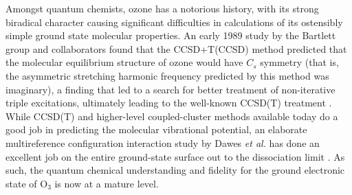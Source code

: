 \documentclass[12pt,a4paper,prb,aps,superscriptaddress]{revtex4}
\begin{document}
Amongst quantum chemists, ozone has a notorious history, with its strong
biradical character causing significant difficulties in calculations of its
ostensibly simple ground state molecular properties.  An early 1989 study
\cite{Stanton:Ozone:1989, Stanton:Ozone:1989b} by the Bartlett group and
collaborators found that the CCSD+T(CCSD) method predicted that the molecular
equilibrium structure of ozone would have $C_s$ symmetry (that is, the
asymmetric stretching harmonic frequency predicted by this method was
imaginary), a finding that led to a search for better treatment of
non-iterative triple excitations, ultimately leading to the well-known CCSD(T)
treatment \cite{Raghavachari:89, Urban:ccsd(t):1985, GenrefCCSD(T):93}. While
CCSD(T) and higher-level coupled-cluster methods available today
\cite{kucharski:ccsdtq:1992, Kallay:CCHigh, Matthews:ncc:2015} do a good job
in predicting the molecular vibrational potential, an elaborate multireference
configuration interaction study by Dawes {\it et al.} has done an excellent
job on the entire ground-state surface out to the dissociation limit
\cite{Dawes:ozone:2013}. As such, the quantum chemical understanding and
fidelity for the ground electronic state of O$_3$ is now at a mature level.
\end{document}
